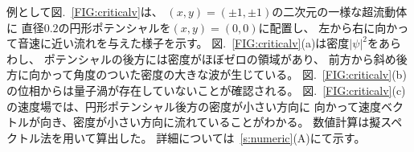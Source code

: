 \documentclass[12pt,a4paper]{jbook}
\begin{document}
        例として図.~\ref{FIG:criticalv}は、
        $(x,y)=(\pm1,\pm1)$の二次元の一様な超流動体に
        直径$0.2$の円形ポテンシャルを$(x,y)=(0,0)$に配置し、
        左から右に向かって音速に近い流れを与えた様子を示す。
        図.~\ref{FIG:criticalv}(a)は密度$|\psi|^2$をあらわし、
        ポテンシャルの後方には密度がほぼゼロの領域があり、
        前方から斜め後方に向かって角度のついた密度の大きな波が生じている。
        図.~\ref{FIG:criticalv}(b)の位相からは量子渦が存在していないことが確認される。
        図.~\ref{FIG:criticalv}(c)の速度場では、円形ポテンシャル後方の密度が小さい方向に
        向かって速度ベクトルが向き、密度が小さい方向に流れていることがわかる。
        数値計算は擬スペクトル法を用いて算出した。
        詳細については~\ref{s:numeric}(A)にて示す。
\end{document}
